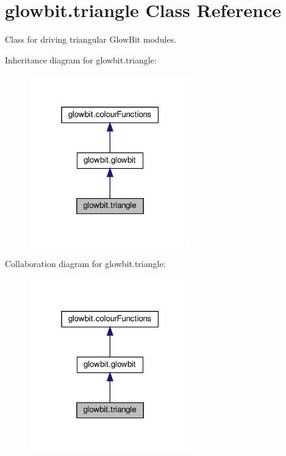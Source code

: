 \hypertarget{classglowbit_1_1triangle}{}\section{glowbit.\+triangle Class Reference}
\label{classglowbit_1_1triangle}


Class for driving triangular Glow\+Bit modules.  




Inheritance diagram for glowbit.\+triangle\+:\nopagebreak
\begin{figure}[H]
\begin{center}
\leavevmode
\includegraphics[width=199pt]{classglowbit_1_1triangle__inherit__graph}
\end{center}
\end{figure}


Collaboration diagram for glowbit.\+triangle\+:\nopagebreak
\begin{figure}[H]
\begin{center}
\leavevmode
\includegraphics[width=199pt]{classglowbit_1_1triangle__coll__graph}
\end{center}
\end{figure}

